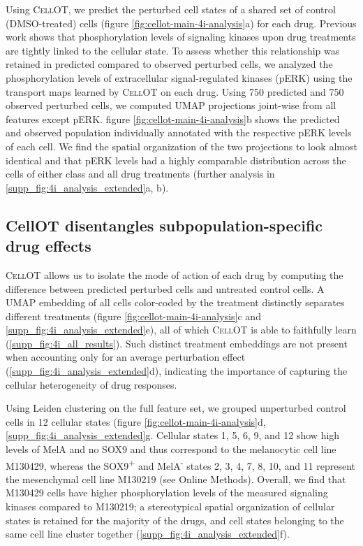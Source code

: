 Using \textsc{CellOT}, 
we predict the perturbed cell states of a shared set of control (DMSO-treated) cells (figure \ref{fig:cellot-main-4i-analysis}a) for each drug.
Previous work \cite{kramer2019cellular} shows that phosphorylation levels of signaling kinases upon drug treatments are tightly linked to the cellular state. 
To assess whether this relationship was retained in predicted compared to observed perturbed cells, we analyzed the phosphorylation levels of extracellular signal-regulated kinases (pERK) using the transport maps learned by \textsc{CellOT} on each drug.
Using 750 predicted and 750 observed perturbed cells, we computed UMAP projections joint-wise from all features except pERK.
figure \ref{fig:cellot-main-4i-analysis}b shows the predicted and observed population individually annotated with the respective pERK levels of each cell.
We find the spatial organization of the two projections to look almost identical and that pERK levels had a highly comparable distribution across the cells of either class and all drug treatments (further analysis in \ref{supp_fig:4i_analysis_extended}a, b).

\subsection{CellOT disentangles subpopulation-specific drug effects}
\textsc{CellOT} allows us to 
isolate the mode of action of each drug by computing the difference between predicted perturbed cells and untreated control cells. %
A UMAP embedding of all cells color-coded by the treatment distinctly separates different treatments (figure \ref{fig:cellot-main-4i-analysis}c and \ref{supp_fig:4i_analysis_extended}e), all of which \textsc{CellOT} is able to faithfully learn (\ref{supp_fig:4i_all_results}).
Such distinct treatment embeddings are not present when accounting only for an average perturbation effect (\ref{supp_fig:4i_analysis_extended}d), indicating the importance of capturing the cellular heterogeneity of drug responses.

Using Leiden clustering on the full feature set, we grouped unperturbed control cells in 12 cellular states (figure \ref{fig:cellot-main-4i-analysis}d, \ref{supp_fig:4i_analysis_extended}g.
Cellular states 1, 5, 6, 9, and 12 show high levels of MelA and no SOX9 and thus correspond to the melanocytic cell line M130429, whereas the SOX9\textsuperscript{+} and MelA\textsuperscript{-} states 2, 3, 4, 7, 8, 10, and 11 represent the mesenchymal cell line M130219 (see Online Methods). Overall, we find that M130429 cells have higher phosphorylation levels of the measured signaling kinases compared to M130219;
a stereotypical spatial organization of cellular states is retained for the majority of the drugs,  and cell states belonging to the same cell line cluster together (\ref{supp_fig:4i_analysis_extended}f). 

